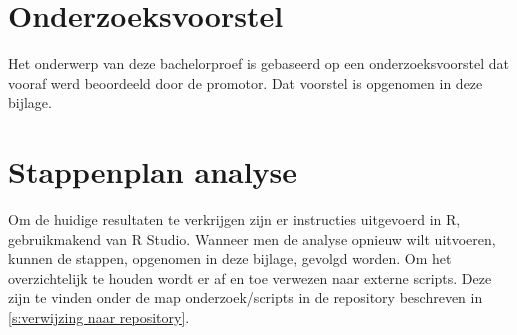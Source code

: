 \documentclass[fleqn,a4paper,12pt]{book}
\begin{document}
\printglossaries











%
%




\appendix


\chapter{Onderzoeksvoorstel}
\label{apendix:onderzoeksvoorstel}
Het onderwerp van deze bachelorproef is gebaseerd op een onderzoeksvoorstel dat vooraf werd beoordeeld door de promotor. Dat voorstel is opgenomen in deze bijlage.




\chapter{Stappenplan analyse}
\label{appendix:stappenplan analyse}

Om de huidige resultaten te verkrijgen zijn er instructies uitgevoerd in R, gebruikmakend van R Studio. Wanneer men de analyse opnieuw wilt uitvoeren, kunnen de stappen, opgenomen in deze bijlage, gevolgd worden. Om het overzichtelijk te houden wordt er af en toe verwezen naar externe scripts. Deze zijn te vinden onder de map onderzoek/scripts in de repository beschreven in \ref{s:verwijzing naar repository}.



\printbibliography[heading=bibintoc]
\end{document}
